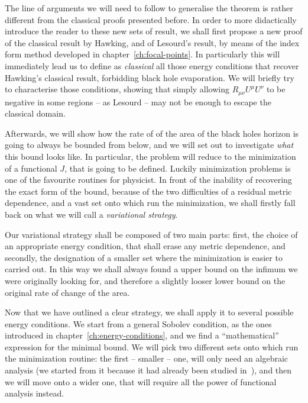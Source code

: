 The line of arguments we will need to follow to generalise the theorem is rather different from the classical proofs presented before. In order to more didactically introduce the reader to these new sets of result, we shall first propose a new proof of the classical result by Hawking, and of Lesourd's result, by means of the index form method developed in chapter~\ref{ch:focal-points}. In particularly this will immediately lead us to define as \emph{classical} all those energy conditions that recover Hawking's classical result, forbidding black hole evaporation. We will briefly try to characterise those conditions, showing that simply allowing \(R_{\mu\nu}U^{\mu}U^{\nu}\) to be negative in some regions -- as Lesourd -- may not be enough to escape the classical domain.

Afterwards, we will show how the rate of of the area of the black holes horizon is going to always be bounded from below, and we will set out to investigate \emph{what} this bound looks like. In particular, the problem will reduce to the minimization of a functional \(J\), that is going to be defined.
Luckily minimization problems is one of the favourite routines for physicist. In front of the inability of recovering the exact form of the bound, because of the two difficulties of a residual metric dependence, and a vast set onto which run the minimization, we shall firstly fall back on what we will call a \emph{variational strategy}.

Our variational strategy shall be composed of two main parts: first, the choice of an appropriate energy condition, that shall erase any metric dependence, and secondly, the designation of a smaller set where the minimization is easier to carried out. In this way we shall always found a upper bound on the infimum we were originally looking for, and therefore a slightly looser lower bound on the original rate of change of the area.

Now that we have outlined a clear strategy, we shall apply it to several possible energy conditions. We start from a general Sobolev condition, as the ones introduced in chapter~\ref{ch:energy-conditions}, and we find a ``mathematical'' expression for the minimal bound. We will pick two different sets onto which run the minimization routine: the first -- smaller -- one, will only need an algebraic analysis (we started from it because it had already been studied in~\cite[]{fewster2020new}), and then we will move onto a wider one, that will require all the power of functional analysis instead.

